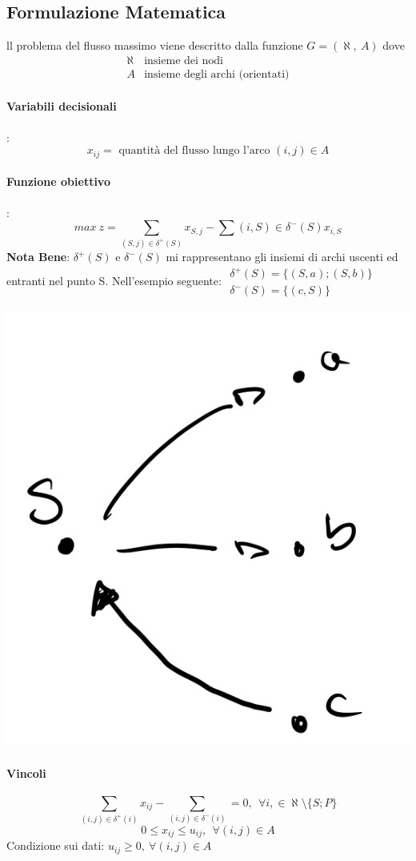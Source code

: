 \documentclass[12pt,a4paper]{article}
\begin{document}
\subsection{Formulazione Matematica}
ll problema del flusso massimo viene descritto dalla funzione $G=(\aleph,\ A)$ dove $$\begin{array}{ll}\aleph & \text{insieme dei nodi}\\A & \text{insieme degli archi (orientati)}\end{array}$$
\paragraph{Variabili decisionali}: $$x_{ij} =  \text{ quantità del flusso lungo l'arco } (i,j) \in A$$
\paragraph{Funzione obiettivo}: $$max \ z = \sum_{(S,j)\in \delta^+(S)}x_{S,j} - \sum{(i,S)\in \delta^-(S)}x_{i,S}$$
\textbf{Nota Bene}: $\delta^+(S)$ e $\delta^-(S)$ mi rappresentano gli insiemi di archi uscenti ed entranti nel punto S. Nell'esempio seguente: $\begin{array}{l}\delta^+ (S)= \{(S,a);(S,b)\}\\\delta^-(S) = \{(c,S)\}\end{array}$
\begin{center}
\includegraphics[width=0.3\columnwidth]{img/archi_es.jpeg}\\
\end{center}
\paragraph{Vincoli}
$$\sum_{(i,j)\in \delta^+(i)}x_{ij} - \sum_{(i,j)\in \delta^-(i)} = 0, \ \ \forall i, \in \aleph \setminus\{S;P\}$$
$$0 \leq x_{ij} \leq u_{ij}, \ \ \forall (i,j) \in A$$
Condizione sui dati: $u_{ij} \geq 0, \ \forall (i,j) \in A$
\end{document}
